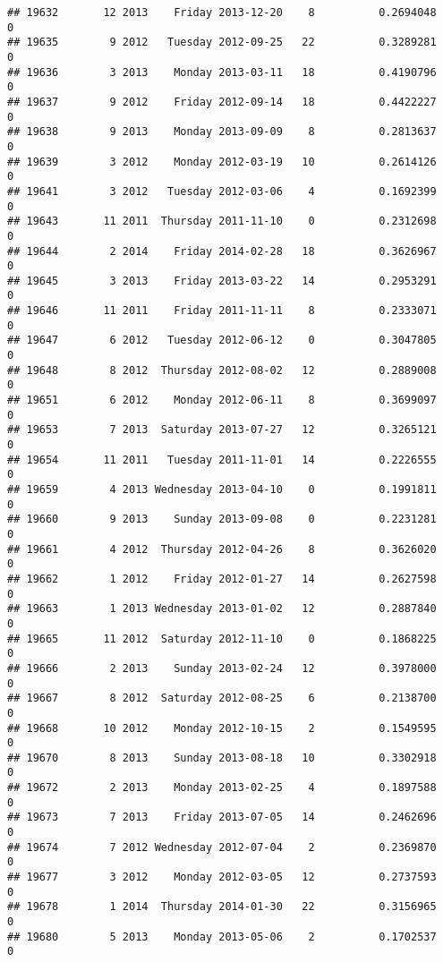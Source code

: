 \documentclass[
]{article}
\begin{document}
\begin{verbatim}
## 19632       12 2013    Friday 2013-12-20    8          0.2694048             0
## 19635        9 2012   Tuesday 2012-09-25   22          0.3289281             0
## 19636        3 2013    Monday 2013-03-11   18          0.4190796             0
## 19637        9 2012    Friday 2012-09-14   18          0.4422227             0
## 19638        9 2013    Monday 2013-09-09    8          0.2813637             0
## 19639        3 2012    Monday 2012-03-19   10          0.2614126             0
## 19641        3 2012   Tuesday 2012-03-06    4          0.1692399             0
## 19643       11 2011  Thursday 2011-11-10    0          0.2312698             0
## 19644        2 2014    Friday 2014-02-28   18          0.3626967             0
## 19645        3 2013    Friday 2013-03-22   14          0.2953291             0
## 19646       11 2011    Friday 2011-11-11    8          0.2333071             0
## 19647        6 2012   Tuesday 2012-06-12    0          0.3047805             0
## 19648        8 2012  Thursday 2012-08-02   12          0.2889008             0
## 19651        6 2012    Monday 2012-06-11    8          0.3699097             0
## 19653        7 2013  Saturday 2013-07-27   12          0.3265121             0
## 19654       11 2011   Tuesday 2011-11-01   14          0.2226555             0
## 19659        4 2013 Wednesday 2013-04-10    0          0.1991811             0
## 19660        9 2013    Sunday 2013-09-08    0          0.2231281             0
## 19661        4 2012  Thursday 2012-04-26    8          0.3626020             0
## 19662        1 2012    Friday 2012-01-27   14          0.2627598             0
## 19663        1 2013 Wednesday 2013-01-02   12          0.2887840             0
## 19665       11 2012  Saturday 2012-11-10    0          0.1868225             0
## 19666        2 2013    Sunday 2013-02-24   12          0.3978000             0
## 19667        8 2012  Saturday 2012-08-25    6          0.2138700             0
## 19668       10 2012    Monday 2012-10-15    2          0.1549595             0
## 19670        8 2013    Sunday 2013-08-18   10          0.3302918             0
## 19672        2 2013    Monday 2013-02-25    4          0.1897588             0
## 19673        7 2013    Friday 2013-07-05   14          0.2462696             0
## 19674        7 2012 Wednesday 2012-07-04    2          0.2369870             0
## 19677        3 2012    Monday 2012-03-05   12          0.2737593             0
## 19678        1 2014  Thursday 2014-01-30   22          0.3156965             0
## 19680        5 2013    Monday 2013-05-06    2          0.1702537             0

\end{verbatim}
\end{document}
